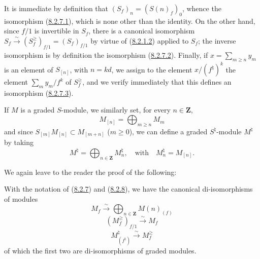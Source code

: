 It is immediate by definition that
$(S_f)_n=(S(n)_f)_0$, whence the isomorphism
(\hyperref[II.8.2.7.1]{8.2.7.1}), which is none other than the identity. On the other
hand, since $f/1$ is invertible in $S_f$, there is a canonical isomorphism
$S_f\xrightarrow{\sim}(S_f^{\geq})_{f/1}=(S_f)_{f/1}$ by virtue of
(\hyperref[II.8.2.1.2]{8.2.1.2}) applied to $S_f$; the inverse
isomorphism is by definition the isomorphism
(\hyperref[II.8.2.7.2]{8.2.7.2}). Finally, if
$x=\sum_{m\geq n}y_m$ is an element of $S_{[n]}$, with $n=kd$, we assign
to the element $x/(f^\natural)^k$ the element
$\sum_m y_m/f^k$ of $S_f^{\geq}$, and we verify immediately that this defines an
isomorphism (\hyperref[II.8.2.7.3]{8.2.7.3}).

\begin{env}[8.2.8]
\label{II.8.2.8}
If $M$ is a graded $S$-module, we similarly set, for every $n\in\mathbf{Z}$,
\begin{equation}
\label{II.8.2.8.1}
  M_{[n]}=\bigoplus_{m\geq n}M_m
\tag{8.2.8.1}
\end{equation}
and since $S_{[m]}M_{[n]}\subset M_{[m+n]}$ ($m\geq0$), we can define a
graded $S^\natural$-module $M^\natural$ by taking
\begin{equation}
\label{II.8.2.8.2}
  M^\natural=\bigoplus_{n\in\mathbf{Z}}M_n^\natural,
  \quad\text{with}\quad M_n^\natural=M_{[n]}.
\tag{8.2.8.2}
\end{equation}
\end{env}

We again leave to the reader the proof of the following:

\begin{lemma}[8.2.9]
\label{II.8.2.9}
With the notation of (\hyperref[II.8.2.7]{8.2.7}) and
(\hyperref[II.8.2.8]{8.2.8}), we have the canonical di-isomorphisms of
modules
\begin{equation}
\label{II.8.2.9.1}
  M_f\xrightarrow{\sim}\bigoplus_{n\in\mathbf{Z}}M(n)_{(f)}
\tag{8.2.9.1}
\end{equation}
\begin{equation}
\label{II.8.2.9.2}
  (M_f^{\geq})_{f/1}\xrightarrow{\sim}M_f
\tag{8.2.9.2}
\end{equation}
\begin{equation}
\label{II.8.2.9.3}
  M^\natural_{(f^\natural)}\xrightarrow{\sim}M_f^{\geq}
\tag{8.2.9.3}
\end{equation}
of which the first two are di-isomorphisms of graded modules.
\end{lemma}

